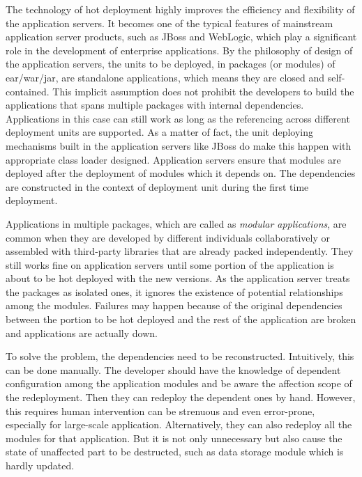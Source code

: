\documentclass[conference]{IEEEtran}
\begin{document}
The technology of hot deployment highly improves the efficiency and flexibility of the application servers.
It becomes one of the typical features of mainstream application server products, such as JBoss\cite{jboss} and WebLogic\cite{weblogic}, which play a significant role in the development of enterprise applications. By the philosophy of design of the application servers, the units to be deployed, in packages (or modules) of ear/war/jar, are standalone applications, which means they are closed and self-contained. This implicit assumption does not prohibit the developers to build the applications that spans multiple packages with internal dependencies. Applications in this case can still work as long as the referencing across different deployment units are supported. As a matter of fact, the unit deploying mechanisms built in the application servers like JBoss do make this happen with appropriate class loader designed. Application servers ensure that modules are deployed after the deployment of modules which it depends on. The dependencies are constructed in the context of deployment unit during the first time deployment.

Applications in multiple packages, which are called as \emph{modular applications}, are common when they are developed by different individuals collaboratively or assembled with third-party libraries that are already packed independently. They still works fine on application servers until some portion of the application is about to be hot deployed  with the new versions. As the application server treats the packages as isolated ones, it ignores the existence of potential relationships among the modules. Failures may happen because of the original dependencies between the portion to be hot deployed and the rest of the application are broken and applications are actually down\cite{middleware_reliability}.

To solve the problem, the dependencies need to be reconstructed. Intuitively, this can be done manually. The developer should have the knowledge of dependent configuration among the application modules and be aware the affection scope of the redeployment. Then they can redeploy the dependent ones by hand. However, this requires human intervention can be strenuous and even error-prone, especially for large-scale application. Alternatively, they can also redeploy all the modules for that application. But it is not only unnecessary but also cause the state of unaffected part to be destructed, such as data storage module which is hardly updated. 
\end{document}
